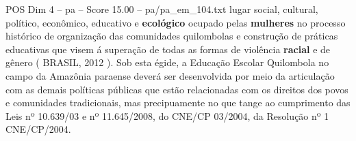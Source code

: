 \begin{textsample}{POS Dim 4 – pa – Score 15.00 – pa/pa\_em\_104.txt}
lugar social, cultural, político, econômico, educativo e \textbf{ecológico} ocupado pelas \textbf{mulheres} no processo histórico de organização das comunidades quilombolas e construção de práticas educativas que visem á superação de todas as formas de violência \textbf{racial} e de gênero ( BRASIL, 2012 ).
Sob esta égide, a Educação Escolar Quilombola no campo da Amazônia paraense deverá ser desenvolvida por meio da articulação com as demais políticas públicas que estão relacionadas com os direitos dos povos e comunidades tradicionais, mas precipuamente no que tange ao cumprimento das Leis nº 10.639/03 e nº 11.645/2008, do CNE/CP 03/2004, da Resolução nº 1 CNE/CP/2004.

\end{textsample}
